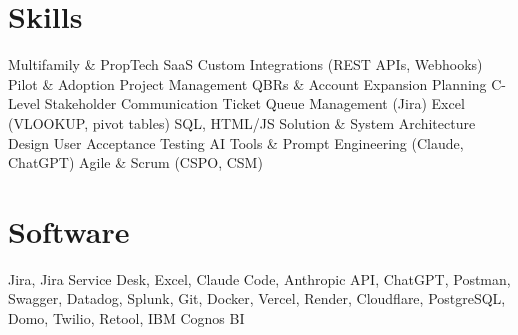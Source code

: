 \documentclass[10pt,letterpaper]{article}
\begin{document}
\section{Skills}
Multifamily \& PropTech SaaS \textbullet{} Custom Integrations (REST APIs, Webhooks) \textbullet{} Pilot \& Adoption Project Management \textbullet{} QBRs \& Account Expansion Planning \textbullet{} C-Level Stakeholder Communication \textbullet{} Ticket Queue Management (Jira) \textbullet{} Excel (VLOOKUP, pivot tables) \textbullet{} SQL, HTML/JS \textbullet{} Solution \& System Architecture Design \textbullet{} User Acceptance Testing \textbullet{} AI Tools \& Prompt Engineering (Claude, ChatGPT) \textbullet{} Agile \& Scrum (CSPO, CSM)

\section{Software}
Jira, Jira Service Desk, Excel, Claude Code, Anthropic API, ChatGPT, Postman, Swagger, Datadog, Splunk, Git, Docker, Vercel, Render, Cloudflare, PostgreSQL, Domo, Twilio, Retool, IBM Cognos BI
\end{document}
